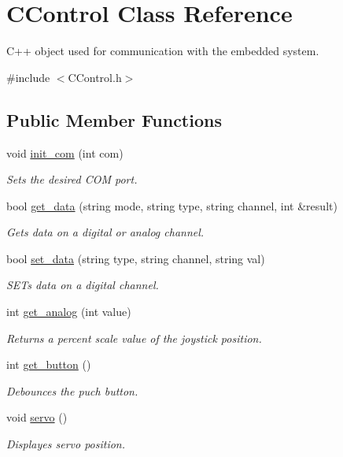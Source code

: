 \hypertarget{class_c_control}{}\section{C\+Control Class Reference}
\label{class_c_control}


C++ object used for communication with the embedded system.  




{\ttfamily \#include $<$C\+Control.\+h$>$}

\subsection*{Public Member Functions}
\begin{DoxyCompactItemize}
\item 
void \hyperlink{class_c_control_a96db7512a2239f017fc27354eb840abf}{init\+\_\+com} (int com)
\begin{DoxyCompactList}\small\item\em Sets the desired C\+OM port. \end{DoxyCompactList}\item 
bool \hyperlink{class_c_control_a08d481253181db60a8aec73583a1713f}{get\+\_\+data} (string mode, string type, string channel, int \&result)
\begin{DoxyCompactList}\small\item\em Gets data on a digital or analog channel. \end{DoxyCompactList}\item 
bool \hyperlink{class_c_control_a96b82a830c7dca2ee4fd66f5c04d0c9a}{set\+\_\+data} (string type, string channel, string val)
\begin{DoxyCompactList}\small\item\em S\+E\+Ts data on a digital channel. \end{DoxyCompactList}\item 
int \hyperlink{class_c_control_acf0620145af8af25d74656b0e66e8658}{get\+\_\+analog} (int value)
\begin{DoxyCompactList}\small\item\em Returns a percent scale value of the joystick position. \end{DoxyCompactList}\item 
int \hyperlink{class_c_control_afae6ad2b10c7afb9c627e7824f30ff42}{get\+\_\+button} ()
\begin{DoxyCompactList}\small\item\em Debounces the puch button. \end{DoxyCompactList}\item 
void \hyperlink{class_c_control_a1a643d9630738943580882ea97e4caec}{servo} ()
\begin{DoxyCompactList}\small\item\em Displayes servo position. \end{DoxyCompactList}\end{DoxyCompactItemize}
